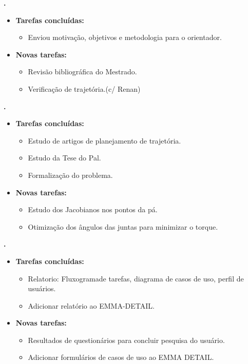 	
	  \textbf{\elael.} 
	\begin{itemize}
		\item \textbf{Tarefas concluídas:}
			\begin{itemize}    
				\item Enviou motivação, objetivos e metodologia para o orientador.
			\end{itemize}
		
		\item \textbf{Novas tarefas:}
			\begin{itemize} 
			    \item Revisão bibliográfica do Mestrado.
			    \item Verificação de trajetória.(c/ Renan)
			\end{itemize}
	\end{itemize}			
			
  \textbf{\renan.} 
	\begin{itemize}
		\item \textbf{Tarefas concluídas:}
			\begin{itemize}    
				\item Estudo de artigos de planejamento de trajetória.
				\item Estudo da Tese do Pal.
				\item Formalização do problema.
			\end{itemize}
		
		\item \textbf{Novas tarefas:}
			\begin{itemize} 
			    \item Estudo dos Jacobianos nos pontos da pá.
			    \item Otimização dos ângulos das juntas para minimizar o torque.
			\end{itemize}
	\end{itemize}	
			
   \textbf{\julia.} 
	\begin{itemize}
		\item \textbf{Tarefas concluídas:}
			\begin{itemize}    
				\item Relatorio: Fluxogramade tarefas, diagrama de casos de uso, perfil de
				usuários.
				\item Adicionar relatório ao EMMA-DETAIL.
			\end{itemize}
		
		\item \textbf{Novas tarefas:}
			\begin{itemize} 
			    \item Resultados de questionários para concluir pesquisa do usuário.
			    \item Adicionar formulários de casos de uso ao EMMA DETAIL.
			\end{itemize}
	\end{itemize}		




